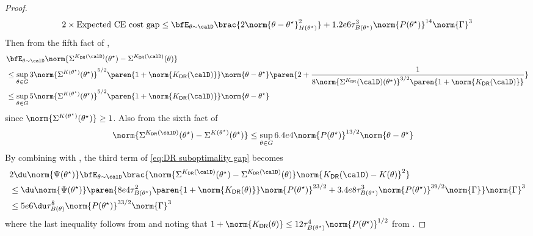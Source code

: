 \begin{proof}
\begin{align}
        2 \times \mbox{Expected CE cost gap} \leq \bfE_{\theta\sim\calD}\brac{2\norm{\theta-\theta^\star}^2_{H(\theta^\star)}} + 1.2e6\tau_{B(\theta^\star)}^3\norm{P(\theta^\star)}^{14}\norm{\Gamma}^3 \label{eq:second term of DR suboptimality gap}
    \end{align}
    Then from the fifth fact of , 
    \begin{align*}
        &\bfE_{\theta\sim\calD}\norm{\Sigma^{K_{\mathsf{DR}}(\calD)}(\theta^\star) - \Sigma^{K_{\mathsf{DR}}(\calD)}(\theta)} \\
        &\leq\sup_{\theta\in G}3\norm{\Sigma^{K(\theta^\star)}(\theta^\star)}^{5/2}\paren{1+\norm{K_{\mathsf{DR}}(\calD)}}\norm{\theta-\theta^\star}\paren{2 + \frac{1}{8\norm{\Sigma^{K_{\mathsf{DR}}}(\calD)(\theta^\star)}^{3/2}\paren{1+\norm{K_{\mathsf{DR}}(\calD)}}}}
        \\
        &\leq \sup_{\theta\in G}5\norm{\Sigma^{K(\theta^\star)}(\theta^\star)}^{5/2}\paren{1+\norm{K_{\mathsf{DR}}(\calD)}}\norm{\theta-\theta^\star}
    \end{align*}
    since $\norm{\Sigma^{K(\theta^\star)}(\theta^\star)} \geq 1$. Also from the sixth fact of 
    \begin{align*}
        &\norm{\Sigma^{K_{\mathsf{DR}}(\calD)}(\theta^\star) - \Sigma^{K(\theta^\star)}(\theta^\star)} \leq \sup_{\theta\in G}6.4e4\norm{P(\theta^\star)}^{13/2}\norm{\theta-\theta^\star}
    \end{align*}
    By combining with , the third term of \eqref{eq:DR suboptimality gap} becomes
    \begin{align}
        &2 \du \norm{\Psi(\theta^\star)} \bfE_{\theta\sim\calD}\brac{\norm{\Sigma^{K_{\mathsf{DR}}(\calD)}(\theta^\star) - \Sigma^{K_{\mathsf{DR}}(\calD)}(\theta)} \norm{K_{\mathsf{DR}}(\calD) - K(\theta)}^2} \nonumber \\
        &\leq \du \norm{\Psi(\theta^\star)}  \paren{8e4\tau_{B(\theta^\star)}^2\paren{1+\norm{K_{\mathsf{DR}}(\theta)}}\norm{P(\theta^\star)}^{23/2} + 3.4e8\tau_{B(\theta^\star)}^3\norm{P(\theta^\star)}^{39/2}\norm{\Gamma}}\norm{\Gamma}^3 \nonumber  \\
        &\leq 5e6\du\tau^8_{B(\theta)}\norm{P(\theta^\star)}^{33/2}\norm{\Gamma}^3 \label{eq:third term of DR suboptimality gap}
    \end{align}
    where the last inequality follows from  and noting that $1+\norm{K_{\mathsf{DR}}(\theta)}\leq12\tau_{B(\theta^\star)}^4\norm{P(\theta^\star)}^{1/2}$ from .

\end{proof}
